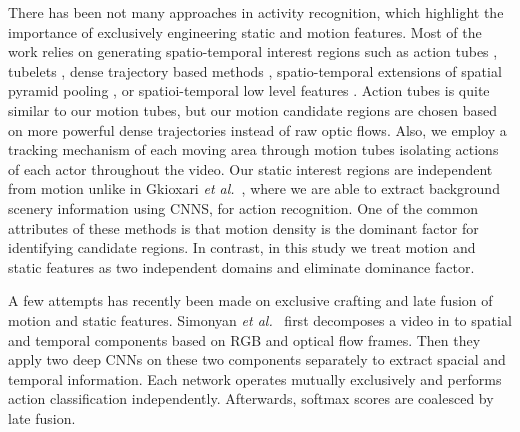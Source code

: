 
There has been not many approaches in activity recognition, which highlight the
importance of exclusively engineering static and motion features. Most of the work
relies on generating spatio-temporal interest regions such as action tubes \cite{gkioxari2015finding},
tubelets \cite{jain2014action}, dense trajectory based methods \cite{van2015apt, wang2015action},
spatio-temporal extensions of spatial pyramid pooling \cite{laptev2008learning},
or spatioi-temporal low level features  \cite{schuldt2004recognizing, ke2005efficient,shechtman2005space, wang2011action, klaser2008spatio, yu2010real}. Action tubes \cite{gkioxari2015finding} is quite similar to
our motion tubes, but our motion candidate regions are chosen based on more powerful dense trajectories \cite{wang2011action} instead of
raw optic flows. Also, we employ a tracking mechanism of each moving area through motion tubes isolating actions
of each actor throughout the video. Our static interest regions are independent from motion
unlike in Gkioxari \textit{et al.}~\cite{gkioxari2015finding}, where we are able to extract background scenery information using CNNS, for
action recognition.
One of the common attributes of these methods is that motion density is the
dominant factor for identifying candidate regions.
In contrast, in this study we treat motion and static features
as two independent domains and eliminate dominance factor.

A few attempts has recently been made on exclusive crafting and late fusion
of motion and static features. Simonyan \textit{et al.}~\cite{simonyan2014two} first decomposes a video in to
spatial and temporal components based on RGB and optical flow frames.
Then they apply two deep CNNs on these two components separately to extract spacial and
temporal information. Each network operates mutually exclusively and performs action classification
independently. Afterwards, softmax scores are coalesced by late fusion.

